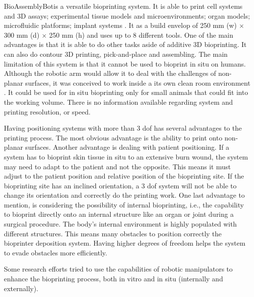 BioAssemblyBot\textregistered is a versatile bioprinting system. It is able to print cell systems and 3D assays; experimental tissue models and microenvironments; organ models; microfluidic platforms; implant systems \cite{Advanced2020_bioassemblybot}. It as a build envelop of 250 mm (w) $\times$ 300 mm (d) $\times$ 250 mm (h) and uses up to 8 different tools. One of the main advantages is that it is able to do other tasks aside of additive 3D bioprinting. It can also do contour 3D printing, pick-and-place and assembling. The main limitation of this system is that it cannot be used to bioprint in situ on humans. Although the robotic arm would allow it to deal with the challenges of non-planar surfaces, it was conceived to work inside a its own clean room environment \cite{Advanced2020_bioassemblybot}. It could be used for in situ bioprinting only for small animals that could fit into the working volume. There is no information available regarding system and printing resolution, or speed.

Having positioning systems with more than 3 \gls{dof} has several advantages to the printing process. The most obvious advantage is the ability to print onto non-planar surfaces. Another advantage is dealing with patient positioning. If a system has to bioprint skin tissue in situ to an extensive burn wound, the system may need to adapt to the patient and not the opposite. This means it must adjust to the patient position and relative position of the bioprinting site. If the bioprinting site has an inclined orientation, a 3 \gls{dof} system will not be able to change its orientation and correctly do the printing work. One last advantage to mention, is considering the possibility of internal bioprinting, i.e., the capability to bioprint directly onto an internal structure like an organ or joint during a surgical procedure. The body's internal environment is highly populated with different structures. This means many obstacles to position correctly the bioprinter deposition system. Having higher degrees of freedom helps the system to evade obstacles more efficiently.\bigskip

Some research efforts tried to use the capabilities of robotic manipulators to enhance the bioprinting process, both in vitro and in situ (internally and externally).

